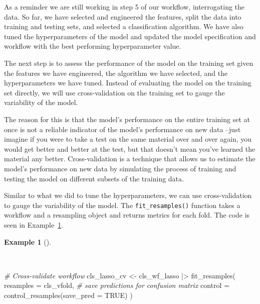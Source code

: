 \documentclass[
  letterpaper,
]{latex/krantz}
\newenvironment{Shaded}{\begin{snugshade}}{\end{snugshade}}
\newcommand{\AttributeTok}[1]{\textcolor[rgb]{0.00,0.00,0.00}{#1}}
\newcommand{\CommentTok}[1]{\textcolor[rgb]{0.00,0.00,0.00}{\textit{#1}}}
\newcommand{\ConstantTok}[1]{\textcolor[rgb]{0.00,0.00,0.00}{#1}}
\newcommand{\FunctionTok}[1]{\textcolor[rgb]{0.00,0.00,0.00}{#1}}
\newcommand{\NormalTok}[1]{\textcolor[rgb]{0.00,0.00,0.00}{#1}}
\newcommand{\OtherTok}[1]{\textcolor[rgb]{0.00,0.00,0.00}{#1}}
\newcommand{\SpecialCharTok}[1]{\textcolor[rgb]{0.00,0.00,0.00}{#1}}
\theoremstyle{definition}
\newtheorem{example}{Example}[chapter]
\theoremstyle{remark}
\begin{document}
As a reminder we are still working in step 5 of our workflow,
interrogating the data. So far, we have selected and engineered the
features, split the data into training and testing sets, and selected a
classification algorithm. We have also tuned the hyperparameters of the
model and updated the model specification and workflow with the best
performing hyperparameter value.

The next step is to assess the performance of the model on the training
set given the features we have engineered, the algorithm we have
selected, and the hyperparameters we have tuned. Instead of evaluating
the model on the training set directly, we will use cross-validation on
the training set to gauge the variability of the model.

The reason for this is that the model's performance on the entire
training set at once is not a reliable indicator of the model's
performance on new data --just imagine if you were to take a test on the
same material over and over again, you would get better and better at
the test, but that doesn't mean you've learned the material any better.
Cross-validation is a technique that allows us to estimate the model's
performance on new data by simulating the process of training and
testing the model on different subsets of the training data.

Similar to what we did to tune the hyperparameters, we can use
cross-validation to gauge the variability of the model. The
\texttt{fit\_resamples()} function takes a workflow and a resampling
object and returns metrics for each fold. The code is seen in
Example~\ref{exm-predict-class-tune-hyperparameters-evaluate-workflow-cv}.

\begin{example}[]\protect\hypertarget{exm-predict-class-tune-hyperparameters-evaluate-workflow-cv}{}\label{exm-predict-class-tune-hyperparameters-evaluate-workflow-cv}

~

\begin{Shaded}
\begin{Highlighting}[]
\CommentTok{\# Cross{-}validate workflow}
\NormalTok{cls\_lasso\_cv }\OtherTok{\textless{}{-}}
\NormalTok{  cls\_wf\_lasso }\SpecialCharTok{|\textgreater{}}
  \FunctionTok{fit\_resamples}\NormalTok{(}
    \AttributeTok{resamples =}\NormalTok{ cls\_vfold,}
    \CommentTok{\# save predictions for confusion matrix}
    \AttributeTok{control =} \FunctionTok{control\_resamples}\NormalTok{(}\AttributeTok{save\_pred =} \ConstantTok{TRUE}\NormalTok{)}
\NormalTok{  )}
\end{Highlighting}
\end{Shaded}

\end{example}
\end{document}
